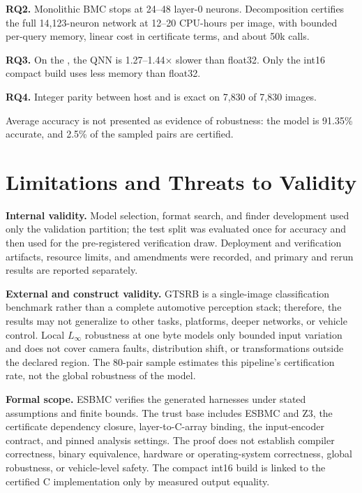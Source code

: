 \textbf{RQ2.} Monolithic BMC stops at 24--48 layer-0 neurons. Decomposition certifies the full 14,123-neuron network at 12--20 CPU-hours per image, with bounded per-query memory, linear cost in certificate terms, and about 50k calls.

\textbf{RQ3.} On the \Aseven{}, the QNN is 1.27--1.44$\times$ slower than float32. Only the int16 compact build uses less memory than float32.

\textbf{RQ4.} Integer parity between host and \Aseven{} is exact on 7,830 of 7,830 images.

Average accuracy is not presented as evidence of robustness: the model is 91.35\% accurate, and 2.5\% of the sampled pairs are certified.

\section{Limitations and Threats to Validity}
\label{sec:limitations}

\textbf{Internal validity.} Model selection, format search, and finder development used only the validation partition; the test split was evaluated once for accuracy and then used for the pre-registered verification draw. Deployment and verification artifacts, resource limits, and amendments were recorded, and primary and rerun results are reported separately.

\textbf{External and construct validity.} GTSRB is a single-image classification benchmark rather than a complete automotive perception stack; therefore, the results may not generalize to other tasks, platforms, deeper networks, or vehicle control. Local $L_\infty$ robustness at one byte models only bounded input variation and does not cover camera faults, distribution shift, or transformations outside the declared region. The 80-pair sample estimates this pipeline's certification rate, not the global robustness of the model.

\textbf{Formal scope.} ESBMC verifies the generated harnesses under stated assumptions and finite bounds. The trust base includes ESBMC and Z3, the certificate dependency closure, layer-to-C-array binding, the input-encoder contract, and pinned analysis settings. The proof does not establish compiler correctness, binary equivalence, hardware or operating-system correctness, global robustness, or vehicle-level safety. The compact int16 build is linked to the certified C implementation only by measured output equality.



